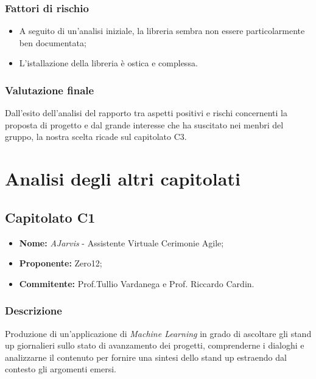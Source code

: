 \documentclass[openany,12pt,a4paper]{report}
\begin{document}
	\subsection{Fattori di rischio}

	\begin{itemize}
		\item A seguito di un'analisi iniziale, la libreria sembra non essere particolarmente ben documentata;

		\item L'istallazione della libreria è ostica e complessa.
	\end{itemize}

	\subsection{Valutazione finale}

	Dall'esito dell'analisi del rapporto tra aspetti positivi e rischi concernenti la proposta di progetto e dal grande interesse che ha suscitato nei menbri del gruppo, la nostra scelta ricade sul capitolato C3.

	\chapter{Analisi degli altri capitolati}


	\section{Capitolato C1}

	\begin{itemize}
		\item \textbf{Nome:} \textit{AJarvis} - Assistente Virtuale Cerimonie Agile;
		\item \textbf{Proponente:} Zero12;
		\item \textbf{Commitente:} Prof.Tullio Vardanega e Prof. Riccardo Cardin.
	\end{itemize}

	\subsection{Descrizione}

	Produzione di un’applicazione di \textit{Machine Learning} in grado di ascoltare gli stand up giornalieri sullo stato di avanzamento dei progetti, comprenderne i dialoghi e analizzarne il contenuto per fornire una sintesi dello stand up estraendo dal contesto gli argomenti emersi.
\end{document}
